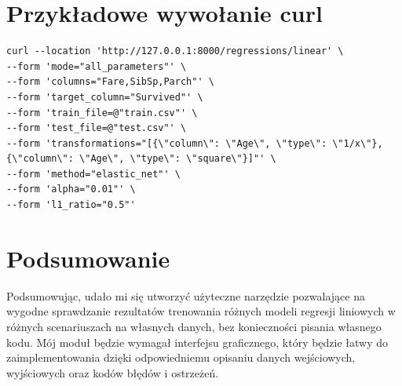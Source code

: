 \documentclass[12pt,a4paper]{article}
\begin{document}
\section{Przykładowe wywołanie curl}
\begin{lstlisting}
curl --location 'http://127.0.0.1:8000/regressions/linear' \
--form 'mode="all_parameters"' \
--form 'columns="Fare,SibSp,Parch"' \
--form 'target_column="Survived"' \
--form 'train_file=@"train.csv"' \
--form 'test_file=@"test.csv"' \
--form 'transformations="[{\"column\": \"Age\", \"type\": \"1/x\"}, {\"column\": \"Age\", \"type\": \"square\"}]"' \
--form 'method="elastic_net"' \
--form 'alpha="0.01"' \
--form 'l1_ratio="0.5"'
\end{lstlisting}

\section{Podsumowanie}
Podsumowując, udało mi się utworzyć użyteczne narzędzie pozwalające na wygodne sprawdzanie rezultatów trenowania różnych modeli regresji liniowych w różnych scenariuszach na własnych danych, bez konieczności pisania własnego kodu. Mój moduł będzie wymagał interfejsu graficznego, który będzie łatwy do zaimplementowania dzięki odpowiedniemu opisaniu danych wejściowych, wyjściowych oraz kodów błędów i ostrzeżeń.
\end{document}
